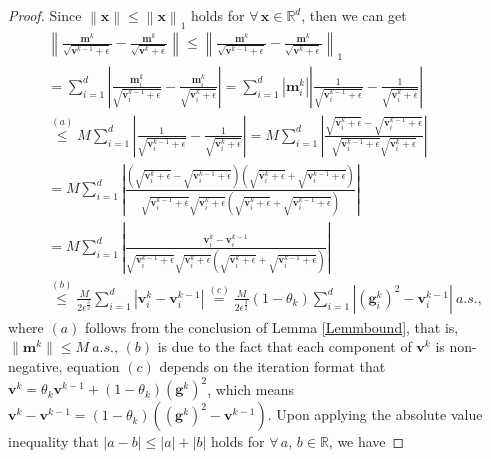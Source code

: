 \documentclass[twoside,11pt]{article}
\begin{document}
\begin{proof}
Since $\left\| \mathbf{x}\right\|\le\left\| \mathbf{x}\right\|_1 $ holds for $\forall\,\mathbf{x}\in\mathbb{R}^d$, then we can get
\begin{equation}\label{yogi.1}
   	\begin{aligned}
   	&\left\| \frac{\mathbf{m}^k}{\sqrt{\mathbf{v}^{k-1}+\epsilon}}-\frac{\mathbf{m}^k}{\sqrt{\mathbf{v}^{k}+\epsilon}}\right\|
   	\le\left\| \frac{\mathbf{m}^k}{\sqrt{\mathbf{v}^{k-1}+\epsilon}}-\frac{\mathbf{m}^k}{\sqrt{\mathbf{v}^{k}+\epsilon}}\right\|_1\\
   	&=\sum_{i=1}^{d}\left| \frac{\mathbf{m}^k_i}{\sqrt{\mathbf{v}^{k-1}_i+\epsilon}}-\frac{\mathbf{m}^k_i}{\sqrt{\mathbf{v}^{k}_i+\epsilon}}\right| 
   	=\sum_{i=1}^{d}\left| \mathbf{m}^k_i \right| \left| \frac{1}{\sqrt{\mathbf{v}^{k-1}_i+\epsilon}}-\frac{1}{\sqrt{\mathbf{v}^{k}_i+\epsilon}}\right| \\
   	&\overset{(a)}{\le}
   	M\sum_{i=1}^{d}\left| \frac{1}{\sqrt{\mathbf{v}^{k-1}_i+\epsilon}}-\frac{1}{\sqrt{\mathbf{v}^{k}_i+\epsilon}}\right|
   	=M\sum_{i=1}^{d}\left|  \frac{\sqrt{\mathbf{v}^{k}_i+\epsilon}-\sqrt{\mathbf{v}^{k-1}_i+\epsilon}}{\sqrt{\mathbf{v}^{k-1}_i+\epsilon}\sqrt{\mathbf{v}^{k}_i+\epsilon}}\right| \\
   	&=M\sum_{i=1}^{d}\left|  \frac{\left( \sqrt{\mathbf{v}^{k}_i+\epsilon}-\sqrt{\mathbf{v}^{k-1}_i+\epsilon}\right) 
   	\left(  \sqrt{\mathbf{v}^{k}_i+\epsilon}+\sqrt{\mathbf{v}^{k-1}_i+\epsilon}\right) }{\sqrt{\mathbf{v}^{k-1}_i+\epsilon}\sqrt{\mathbf{v}^{k}_i+\epsilon}\left(  \sqrt{\mathbf{v}^{k}_i+\epsilon}+\sqrt{\mathbf{v}^{k-1}_i+\epsilon}\right)}\right| \\
   	&=M\sum_{i=1}^{d}\left|  \frac{\mathbf{v}^{k}_i-\mathbf{v}^{k-1}_i }{\sqrt{\mathbf{v}^{k-1}_i+\epsilon}\sqrt{\mathbf{v}^{k}_i+\epsilon}\left(  \sqrt{\mathbf{v}^{k}_i+\epsilon}+\sqrt{\mathbf{v}^{k-1}_i+\epsilon}\right)}\right| \\
   	&\overset{(b)}{\le}
   	\frac{M}{2\epsilon^{\frac{3}{2}}} \sum_{i=1}^{d}\left|  \mathbf{v}^{k}_i-\mathbf{v}^{k-1}_i \right| 
   	\overset{(c)}{=}\frac{M}{2\epsilon^{\frac{3}{2}}}(1-\theta_k) \sum_{i=1}^{d}\left| ({\mathbf{g}}^{k}_i)^2-{\mathbf{v}}^{k-1}_i\right| \ a.s.,
   	\end{aligned}
\end{equation}
where $(a)$ follows from the conclusion of Lemma \ref{Lemmbound}, that is,  $\lVert\mathbf{m}^k \rVert\le M\ a.s.$, $(b)$ is due to the fact that each component of $\mathbf{v}^k$ is non-negative, equation $(c)$ depends on the  iteration format  that $\mathbf{v}^k=\theta_k\mathbf{v}^{k-1}+(1-\theta_k)(\mathbf{g}^k)^2$, which means  ${\mathbf{v}}^{k}-{\mathbf{v}}^{k-1}=(1-\theta_k )\left( ({\mathbf{g}}^{k})^2-{\mathbf{v}}^{k-1}\right)$. Upon applying the absolute value inequality that $\left| a-b\right|\le\left| a\right|+\left| b\right| $ holds for $\forall\, a,\, b\in\mathbb{R}$, we have

\end{proof}
\end{document}
